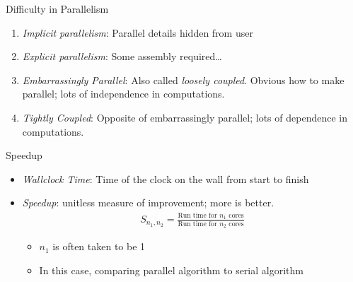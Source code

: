

\begin{frame}
  \begin{block}{Difficulty in Parallelism}
  \begin{enumerate}[<+-|alert@+>]
    \item \emph{Implicit parallelism}:  Parallel details hidden from user
    \item \emph{Explicit parallelism}:  Some assembly required\dots
    \item \emph{Embarrassingly Parallel}:  Also called \emph{loosely coupled}.  
Obvious how to make parallel; lots of independence in computations.
    \item \emph{Tightly Coupled}:  Opposite of embarrassingly parallel; lots of 
dependence in computations.
  \end{enumerate}  
  \end{block}
\end{frame}


\begin{frame}
  \begin{block}{Speedup}
  \begin{itemize}
    \item \emph{Wallclock Time}:  Time of the clock on the wall from start to 
finish
    \item \emph{Speedup}:  unitless measure of improvement; more is better.
  \begin{align*}
   S_{n_1, n_2} =  \frac{\text{Run time for } n_1 \text{ cores}}{\text{Run time 
for } n_2 \text{ cores}}
  \end{align*}
  \begin{itemize}
    \item   $n_1$ is often taken to be 1
    \item In this case, comparing parallel algorithm to serial algorithm
  \end{itemize}
  \end{itemize}
  \end{block}
\end{frame}


